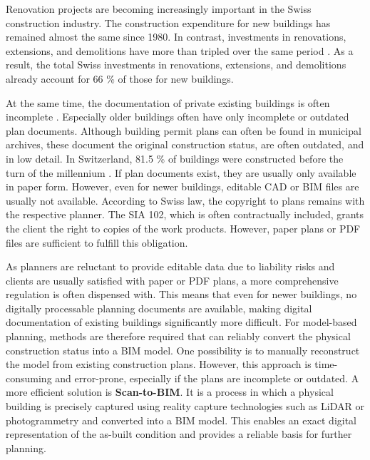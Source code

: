 \begin{English}
    Renovation projects are becoming increasingly important in the Swiss construction industry. The construction expenditure for new buildings has remained almost the same since 1980. In contrast, investments in renovations, extensions, and demolitions have more than tripled over the same period \cite{bundesamtfuerstatstikBauausgabenNachArt}. As a result, the total Swiss investments in renovations, extensions, and demolitions already account for 66 \% of those for new buildings. 

    At the same time, the documentation of private existing buildings is often incomplete \cite{dewolfCircularBuiltEnvironmentg, kadenLeitfadenGeodaesieUnd}. Especially older buildings often have only incomplete or outdated plan documents. Although building permit plans can often be found in municipal archives, these document the original construction status, are often outdated, and in low detail. In Switzerland, 81.5 \% of buildings were constructed before the turn of the millennium \cite{bundesamtfuerstatstikBauperiode}. If plan documents exist, they are usually only available in paper form. However, even for newer buildings, editable CAD or BIM files are usually not available. According to Swiss law, the copyright to plans remains with the respective planner. The SIA 102, which is often contractually included, grants the client the right to copies of the work products. However, paper plans or PDF files are sufficient to fulfill this obligation.

    As planners are reluctant to provide editable data due to liability risks and clients are usually satisfied with paper or PDF plans, a more comprehensive regulation is often dispensed with. This means that even for newer buildings, no digitally processable planning documents are available, making digital documentation of existing buildings significantly more difficult. For model-based planning, methods are therefore required that can reliably convert the physical construction status into a BIM model. One possibility is to manually reconstruct the model from existing construction plans. However, this approach is time-consuming and error-prone, especially if the plans are incomplete or outdated. A more efficient solution is \textbf{Scan-to-BIM}. It is a process in which a physical building is precisely captured using reality capture technologies such as LiDAR or photogrammetry and converted into a BIM model. This enables an exact digital representation of the as-built condition and provides a reliable basis for further planning.


\end{English}
